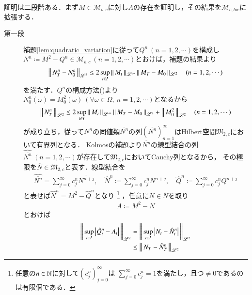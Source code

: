 	\begin{prf}
		証明は二段階ある．まず$M \in \mathcal{M}_{b,c}$に対し$A$の存在を証明し，その結果を$\mathcal{M}_{c,loc}$に拡張する．
		\begin{description}
			\item[第一段]
				補題\ref{lem:quadratic_variation}に従って$Q^n\ (n=1,2,\cdots)$を構成し
				$N^n \coloneqq M^2 - Q^n \in \mathcal{M}_{b,c}\ (n=1,2,\cdots)$とおけば，補題の結果より
				\begin{align}
					\left\|\, N_T^n - N_0^n\, \right\|_{\mathscr{L}^2} \leq 2 \operatorname*{sup}_{t \in I} \left\|\, M_t\, \right\|_{\mathscr{L}^\infty} \left\|\, M_T - M_0\, \right\|_{\mathscr{L}^2} \quad (n=1,2,\cdots)
				\end{align}
				を満たす．$Q^n$の構成方法()より$N_0^n(\omega) = M^2_0(\omega)\ (\forall \omega \in \Omega,\ n=1,2,\cdots)$となるから
				\begin{align}
					\left\|\, N_T^n\, \right\|_{\mathscr{L}^2} 
					\leq 2 \operatorname*{sup}_{t \in I} \left\|\, M_t\, \right\|_{\mathscr{L}^\infty} \left\|\, M_T - M_0\, \right\|_{\mathscr{L}^2} + \left\|\, M^2_0\, \right\|_{\mathscr{L}^2} \quad (n=1,2,\cdots)
				\end{align}
				が成り立ち，従って$N^n$の同値類$\overline{N^n}$の列$(\overline{N^n})_{n=1}^{\infty}$はHilbert空間$\mathfrak{M}_{2,c}$において有界列となる．
				Kolmosの補題より$\overline{N^n}$の線型結合の列$\hat{\overline{N^n}}\ (n=1,2,\cdots)$が存在して$\mathfrak{M}_{2,c}$においてCauchy列となるから，
				その極限を$\overline{N} \in \mathfrak{M}_{2,c}$と表す．線型結合を
				\begin{align}
					\hat{\overline{N^n}} = \sum_{j=0}^{\infty} c^n_j \overline{N^{n+j}}, \quad
					\hat{N}^n \coloneqq \sum_{j=0}^{\infty} c^n_j N^{n+j}, \quad
					\hat{Q}^n \coloneqq \sum_{j=0}^{\infty} c^n_j Q^{n+j}
				\end{align}
				と表せば$\hat{N}^n = M^2 - \hat{Q}^n$となり
				\footnote{
					任意の$n \in \mathbb{N}$に対して$(c^n_j)_{j=0}^{\infty}$は
					$\sum_{j=0}^{\infty} c^n_j = 1$を満たし，且つ$\neq 0$であるのは有限個である．
				}
				，任意に$N \in \overline{N}$を取り
				\begin{align}
					A \coloneqq M^2 - N \label{eq:thm_quadratic_variation_0}
				\end{align}
				とおけば
				\begin{align}
					\Norm{\sup{t \in I}{\left| \hat{Q}_t^n - A_t \right|}}{\mathscr{L}^2}
					&= \Norm{\sup{t \in I}{\left| N_t - \hat{N}_t^n \right|}}{\mathscr{L}^2} \\
					&\leq \Norm{N_T - \hat{N}_T^n}{\mathscr{L}^2} \\

\end{align}
\end{description}
\end{prf}
